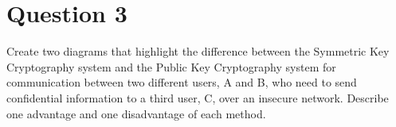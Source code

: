 \documentclass[12pt]{article}
\begin{document}
	\section{Question 3}
	
	Create two diagrams that highlight the difference between the Symmetric Key Cryptography system and the Public Key Cryptography system for communication between two different users, A and B, who need to send confidential information to a third user, C, over an insecure network. Describe one advantage and one disadvantage of each method.
	
\end{document}
